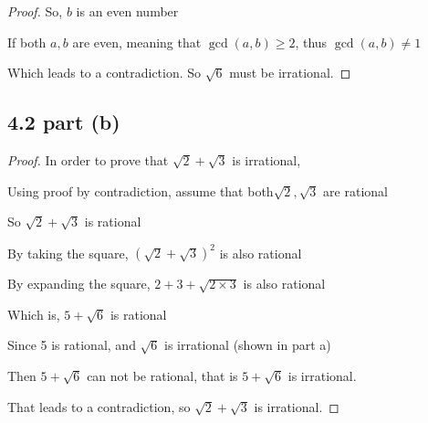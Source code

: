 \documentclass[12pt]{article}
\begin{document}
\begin{proof}
    
    \vspace*{0.3cm}
    \hspace*{1.2cm}
    So, $b$ is an even number

    \vspace*{0.3cm}
    \hspace*{1.2cm}
    If both $a,b$ are even, meaning that $\gcd(a,b) \geq 2 $, thus
    $ \gcd(a,b) \neq 1$

    \vspace*{0.3cm}
    \hspace*{1.2cm}
    Which leads to a contradiction. So $\sqrt{6}$ must be irrational.

    
\end{proof}

\subsection*{4.2 part (b)}

\begin{proof}
    In order to prove that $\sqrt 2 + \sqrt 3 $ is irrational,

    \vspace*{0.3cm}
    \hspace*{1.2cm}
    Using proof by contradiction, assume that both$\sqrt 2, \sqrt 3 $ are rational

    \vspace*{0.3cm}
    \hspace*{1.2cm}
    So $\sqrt{2} + \sqrt 3$  is rational

    \vspace*{0.3cm}
    \hspace*{1.2cm}
    By taking the square, $ (\sqrt 2 + \sqrt 3)^2$ is also rational

    \vspace*{0.3cm}
    \hspace*{1.2cm}
    By expanding the square, $ 2 + 3 + \sqrt{2 \times 3} $ is also rational

    \vspace*{0.3cm}
    \hspace*{1.2cm}
    Which is, $ 5 + \sqrt 6 $ is rational

    \vspace*{0.3cm}
    \hspace*{1.2cm}
    Since 5 is rational, and $\sqrt 6$ is irrational (shown in part a)

    \vspace*{0.3cm}
    \hspace*{1.2cm}
    Then $5+\sqrt 6$ can not be rational, that is $5+\sqrt 6$ is irrational. 

    \vspace*{0.3cm}
    \hspace*{1.2cm}
    That leads to a contradiction, so $\sqrt 2 + \sqrt 3$ is irrational.

\end{proof}
\end{document}
